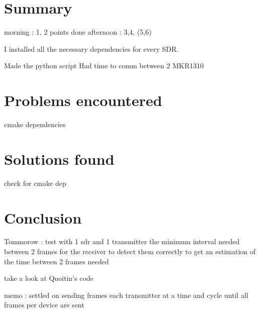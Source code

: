 \documentclass[a4paper, 12pt]{article}
\begin{document}
\section{Summary}
morning : 1, 2 points done 
afternoon : 3,4, (5,6)

I installed all the necessary dependencies for every SDR.

Made the python script 
Had time to comm between 2 MKR1310



\section{Problems encountered} 
cmake dependencies

\section{Solutions found}
check for cmake dep

\section{Conclusion}
Tommorow : test with 1 sdr and 1 transmitter the minimum interval needed between 2 frames for the receiver to detect them correctly
to get an estimation of the time between 2 frames needed

take a look at Quoitin's code 


memo : settled on sending frames each transmitter at a time and cycle until all frames per device are sent
\end{document}

